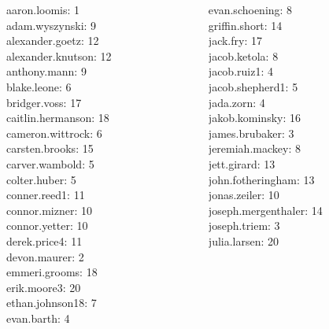 \documentclass[10pt]{beamer}
\begin{document}
\begin{frame}
\footnotesize 
\vfill 
\begin{columns}
\begin{column}{0.33\textwidth}
aaron.loomis: 1 \\ 
adam.wyszynski: 9 \\ 
alexander.goetz: 12 \\ 
alexander.knutson: 12 \\ 
anthony.mann: 9 \\ 
blake.leone: 6 \\ 
bridger.voss: 17 \\ 
caitlin.hermanson: 18 \\ 
cameron.wittrock: 6 \\ 
carsten.brooks: 15 \\ 
carver.wambold: 5 \\ 
colter.huber: 5 \\ 
conner.reed1: 11 \\ 
connor.mizner: 10 \\ 
connor.yetter: 10 \\ 
derek.price4: 11 \\ 
devon.maurer: 2 \\ 
emmeri.grooms: 18 \\ 
erik.moore3: 20 \\ 
ethan.johnson18: 7 \\ 
evan.barth: 4 \\\end{column}
\begin{column}{0.33\textwidth}
evan.schoening: 8 \\ 
griffin.short: 14 \\ 
jack.fry: 17 \\ 
jacob.ketola: 8 \\ 
jacob.ruiz1: 4 \\ 
jacob.shepherd1: 5 \\ 
jada.zorn: 4 \\ 
jakob.kominsky: 16 \\ 
james.brubaker: 3 \\ 
jeremiah.mackey: 8 \\ 
jett.girard: 13 \\ 
john.fotheringham: 13 \\ 
jonas.zeiler: 10 \\ 
joseph.mergenthaler: 14 \\ 
joseph.triem: 3 \\ 
julia.larsen: 20 \\ 

\end{column}
\end{columns}
\end{frame}
\end{document}
